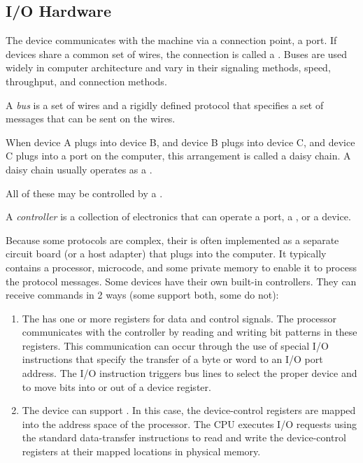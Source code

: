 \subsection{I/O Hardware}\label{subsec:IO_Hardware}
The device communicates with the machine via a connection point, a port.
If devices share a common set of wires, the connection is called a .
Buses are used widely in computer architecture and vary in their signaling methods, speed, throughput, and connection methods.

\begin{definition}[Bus]\label{def:Hardware_Bus}
  A \emph{bus} is a set of wires and a rigidly defined protocol that specifies a set of messages that can be sent on the wires.
\end{definition}

When device A plugs into device B, and device B plugs into device C, and device C plugs into a port on the computer, this arrangement is called a daisy chain.
A daisy chain usually operates as a .

All of these may be controlled by a .

\begin{definition}[Controller]\label{def:Controller}
  A \emph{controller} is a collection of electronics that can operate a port, a , or a device.
\end{definition}

Because some protocols are complex, their   is often implemented as a separate circuit board (or a host adapter) that plugs into the computer.
It typically contains a processor, microcode, and some private memory to enable it to process the protocol messages.
Some devices have their own built-in controllers.
They can receive commands in 2 ways (some support both, some do not):
\begin{enumerate}[noitemsep]
\item The  has one or more registers for data and control signals.
  The processor communicates with the controller by reading and writing bit patterns in these registers.
  This communication can occur through the use of special I/O instructions that specify the transfer of a byte or word to an I/O port address.
  The I/O instruction triggers bus lines to select the proper device and to move bits into or out of a device register.
\item The device  can support .
  In this case, the device-control registers are mapped into the address space of the processor.
  The CPU executes I/O requests using the standard data-transfer instructions to read and write the device-control registers at their mapped locations in physical memory.
\end{enumerate}

